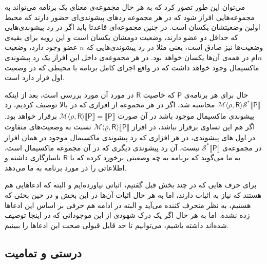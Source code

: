 می‌توان این طور تصور کرد که به هر حال مجموعه‌ی معنای یک برنامه می‌تواند به مجموعه‌هایی افراز شود که در هر مجموعه ردهای پیشوندی‌ای حضور دارند که محیط اولین وضعیتشان یکسان است. در چنین مجموعه‌ای قاعدتا باید اگر در رد پیشوندی‌هایی که حداقل دو عضو دارند، وضعیت دومشان یکسان است و این رویه برای بقیه‌ی وضعیت‌ها نیز صادق است، یعنی مثلا در رد پیشوندی‌هایی که $n$ عضو وجود دارد، وضعیت  $n$ام در همه‌ی آن‌ها یکسان خواهد بود. در هر مجموعه‌ی داخل این افراز یک رد پیشوندی ماکسیمال وجود خواهد داشت که در واقع اجرای کامل برنامه با محیطی که در وضعیت اول قرار دارد است.

حال برای هر برنامه‌ی $\mathsf{P}$ که خاصیت $\mathsf{R}$ در مورد آن مورد بررسی است، بعد از اینکه 
$\mathcal{M} \langle \underline{\rho}, \mathsf{R} \rangle \mathcal{S}^* \llbracket \mathsf{P} \rrbracket$
 محاسبه شد، اگر در هر مجموعه از افرازی که در بالا توصیف کردیم، رد پیشوندی ماکسیمال موجود باشد در آن صورت 
$\mathcal{M} \langle \underline{\rho}, \mathsf{R} \rangle \llbracket \mathsf{P} \rrbracket=
\llbracket \mathsf{P} \rrbracket $
برقرار خواهد بود. اگر هم این تساوی برقرار نباشد، در افراز
$\mathcal{M} \langle \underline{\rho}, \mathsf{R} \rangle \llbracket \mathsf{P} \rrbracket$
نسبت به وضعیت‌های متفاوت در اول های پیشوندی، در هر افزاری که رد پیشوندی ماکسیمال موجود در همان افراز در مجموعه‌ی 
$\mathcal{S}^* \llbracket \mathsf{P} \rrbracket $ 
نیست، آن رد پیشوندی دیگری که در آن مجموعه ماکسیمال است، به ما می‌گوید که برنامه به چه وصعیتی برخورد کرده که با $\mathsf{R}$ ناسازگاری داشته و اطلاعاتی را در مورد برنامه به ما می‌دهد.

برای حرف هایی که در چند بخش قبل گفتیم، اثباتی نیاورده‌ایم و البته که ادعاهایی هم هستند که نیاز به اثبات دارند، اما به هر حال اثبات آن‌ها در این بخش و در حین بحثی که هستیم، به نظر منحرف کننده می‌آید و البته در ادامه هم حرفی بر اساس این ادعاها زده نشده. اما به هر حال اگر یک درک شهودی از این موجوداتی که در اینجا توصیف شده‌اند داشته باشیم، می‌توانیم تا حد قابل قبولی صحت این ادعاها را ببینیم.


\subsection{درستی و تمامیت}







